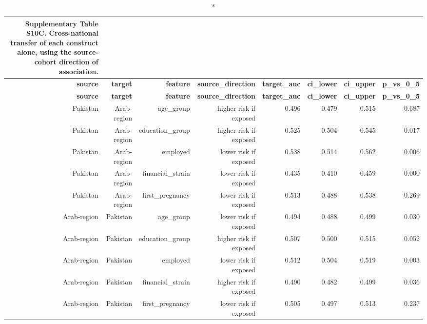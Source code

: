 \documentclass[10pt]{article}
\begin{document}
\tiny
\setlength{\tabcolsep}{2pt}
\begin{longtable}{rrrrrrrr}
\caption*{\textbf{Supplementary Table S10C.} Cross-national transfer of each construct alone, using the source-cohort direction of association.}\\
\toprule
\textbf{source} & \textbf{target} & \textbf{feature} & \textbf{source\_direction} & \textbf{target\_auc} & \textbf{ci\_lower} & \textbf{ci\_upper} & \textbf{p\_vs\_0\_5} \\
\midrule
\endfirsthead
\toprule
\textbf{source} & \textbf{target} & \textbf{feature} & \textbf{source\_direction} & \textbf{target\_auc} & \textbf{ci\_lower} & \textbf{ci\_upper} & \textbf{p\_vs\_0\_5} \\
\midrule
\endhead
\bottomrule
\endfoot
Pakistan & Arab-region & age\_group & higher risk if exposed & 0.496 & 0.479 & 0.515 & 0.687 \\
Pakistan & Arab-region & education\_group & higher risk if exposed & 0.525 & 0.504 & 0.545 & 0.017 \\
Pakistan & Arab-region & employed & lower risk if exposed & 0.538 & 0.514 & 0.562 & 0.006 \\
Pakistan & Arab-region & financial\_strain & lower risk if exposed & 0.435 & 0.410 & 0.459 & 0.000 \\
Pakistan & Arab-region & first\_pregnancy & lower risk if exposed & 0.513 & 0.488 & 0.538 & 0.269 \\
Arab-region & Pakistan & age\_group & lower risk if exposed & 0.494 & 0.488 & 0.499 & 0.030 \\
Arab-region & Pakistan & education\_group & higher risk if exposed & 0.507 & 0.500 & 0.515 & 0.052 \\
Arab-region & Pakistan & employed & lower risk if exposed & 0.512 & 0.504 & 0.519 & 0.003 \\
Arab-region & Pakistan & financial\_strain & higher risk if exposed & 0.490 & 0.482 & 0.499 & 0.036 \\
Arab-region & Pakistan & first\_pregnancy & lower risk if exposed & 0.505 & 0.497 & 0.513 & 0.237 \\
\bottomrule
\end{longtable}
\normalsize
\end{document}
